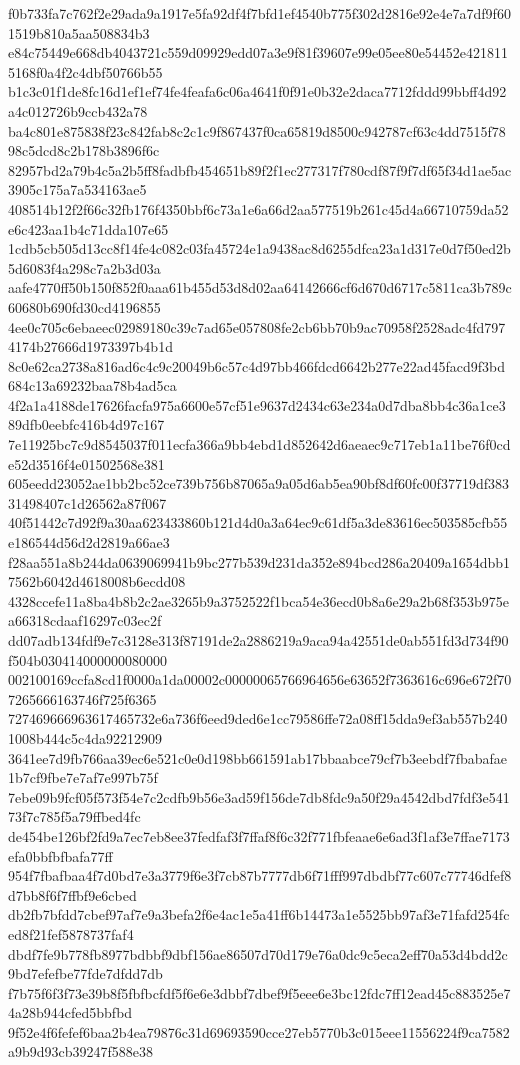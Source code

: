 {f0b733fa7c762f2e29ada9a1917e5fa92df4f7bfd1ef4540b775f302d2816e92e4e7a7df9f601519b810a5aa508834b3
e84c75449e668db4043721c559d09929edd07a3e9f81f39607e99e05ee80e54452e4218115168f0a4f2c4dbf50766b55
b1c3c01f1de8fc16d1ef1ef74fe4feafa6c06a4641f0f91e0b32e2daca7712fddd99bbff4d92a4c012726b9ccb432a78
ba4c801e875838f23c842fab8c2c1c9f867437f0ca65819d8500c942787cf63c4dd7515f7898c5dcd8c2b178b3896f6c
82957bd2a79b4c5a2b5ff8fadbfb454651b89f2f1ec277317f780cdf87f9f7df65f34d1ae5ac3905c175a7a534163ae5
408514b12f2f66c32fb176f4350bbf6c73a1e6a66d2aa577519b261c45d4a66710759da52e6c423aa1b4c71dda107e65
1cdb5cb505d13cc8f14fe4c082c03fa45724e1a9438ac8d6255dfca23a1d317e0d7f50ed2b5d6083f4a298c7a2b3d03a
aafe4770ff50b150f852f0aaa61b455d53d8d02aa64142666cf6d670d6717c5811ca3b789c60680b690fd30cd4196855
4ee0c705c6ebaeec02989180c39c7ad65e057808fe2cb6bb70b9ac70958f2528adc4fd7974174b27666d1973397b4b1d
8c0e62ca2738a816ad6c4c9c20049b6c57c4d97bb466fdcd6642b277e22ad45facd9f3bd684c13a69232baa78b4ad5ca
4f2a1a4188de17626facfa975a6600e57cf51e9637d2434c63e234a0d7dba8bb4c36a1ce389dfb0eebfc416b4d97c167
7e11925bc7c9d8545037f011ecfa366a9bb4ebd1d852642d6aeaec9c717eb1a11be76f0cde52d3516f4e01502568e381
605eedd23052ae1bb2bc52ce739b756b87065a9a05d6ab5ea90bf8df60fc00f37719df38331498407c1d26562a87f067
40f51442c7d92f9a30aa623433860b121d4d0a3a64ec9c61df5a3de83616ec503585cfb55e186544d56d2d2819a66ae3
f28aa551a8b244da0639069941b9bc277b539d231da352e894bcd286a20409a1654dbb17562b6042d4618008b6ecdd08
4328ccefe11a8ba4b8b2c2ae3265b9a3752522f1bca54e36ecd0b8a6e29a2b68f353b975ea66318cdaaf16297c03ec2f
dd07adb134fdf9e7c3128e313f87191de2a2886219a9aca94a42551de0ab551fd3d734f90f504b030414000000080000
002100169ccfa8cd1f0000a1da00002c00000065766964656e63652f7363616c696e672f707265666163746f725f6365
727469666963617465732e6a736f6eed9ded6e1cc79586ffe72a08ff15dda9ef3ab557b2401008b444c5c4da92212909
3641ee7d9fb766aa39ec6e521c0e0d198bb661591ab17bbaabce79cf7b3eebdf7fbabafae1b7cf9fbe7e7af7e997b75f
7ebe09b9fcf05f573f54e7c2cdfb9b56e3ad59f156de7db8fdc9a50f29a4542dbd7fdf3e54173f7c785f5a79ffbed4fc
de454be126bf2fd9a7ec7eb8ee37fedfaf3f7ffaf8f6c32f771fbfeaae6e6ad3f1af3e7ffae7173efa0bbfbfbafa77ff
954f7fbafbaa4f7d0bd7e3a3779f6e3f7cb87b7777db6f71fff997dbdbf77c607c77746dfef8d7bb8f6f7ffbf9e6cbed
db2fb7bfdd7cbef97af7e9a3befa2f6e4ac1e5a41ff6b14473a1e5525bb97af3e71fafd254fced8f21fef5878737faf4
dbdf7fe9b778fb8977bdbbf9dbf156ae86507d70d179e76a0dc9c5eca2eff70a53d4bdd2c9bd7efefbe77fde7dfdd7db
f7b75f6f3f73e39b8f5fbfbcfdf5f6e6e3dbbf7dbef9f5eee6e3bc12fdc7ff12ead45c883525e74a28b944cfed5bbfbd
9f52e4f6fefef6baa2b4ea79876c31d69693590cce27eb5770b3c015eee11556224f9ca7582a9b9d93cb39247f588e38
}
